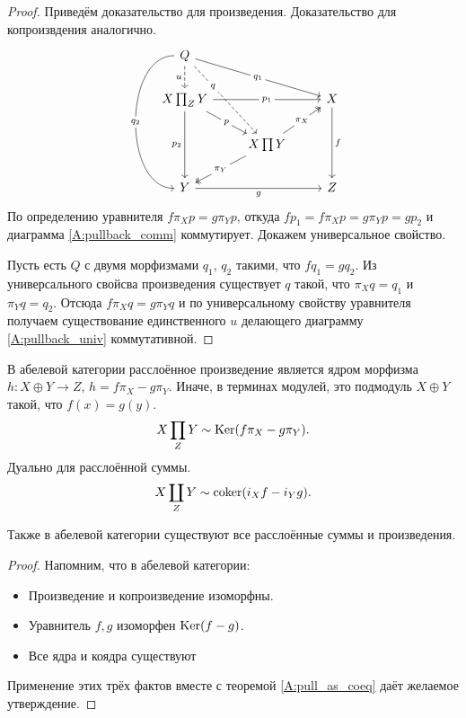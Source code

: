 \documentclass[../main.tex]{subfiles}
\begin{document}
\begin{proof}
Приведём доказательство для произведения. Доказательство для копроизвдения аналогично.
\begin{equation*}
\begin{tikzcd}
	Q \\
	{X\prod_Z Y} && X \\
	& {X\prod Y} \\
	Y && Z
	\arrow["g"', from=4-1, to=4-3]
	\arrow["f", from=2-3, to=4-3]
	\arrow["{\pi_X}"{description}, two heads, from=3-2, to=2-3]
	\arrow["{\pi_Y}"{description}, two heads, from=3-2, to=4-1]
	\arrow["p"{description}, from=2-1, to=3-2]
	\arrow["{p_1}"{description}, from=2-1, to=2-3]
	\arrow["{p_2}"', from=2-1, to=4-1]
	\arrow["{q_1}"{description}, from=1-1, to=2-3]
	\arrow["{q_2}"{description}, bend right=90, from=1-1, to=4-1]
	\arrow["q"{description, pos=0.3}, dashed, from=1-1, to=3-2]
	\arrow["u"', dashed, from=1-1, to=2-1]
\end{tikzcd}
\end{equation*}
По определению уравнителя $f\pi_Xp = g\pi_Yp$, откуда $fp_1 = f\pi_X p = g\pi_Yp = gp_2$ и диаграмма \eqref{A:pullback_comm} коммутирует. Докажем универсальное свойство.

Пусть есть $Q$ с двумя морфизмами $q_1$, $q_2$ такими, что $fq_1 = gq_2$. Из универсального свойсва произведения существует $q$ такой, что $\pi_X q = q_1$ и $\pi_Y q = q_2$. Отсюда $f\pi_X q = g\pi_Y q$ и по универсальному свойству уравнителя получаем существование единственного $u$ делающего диаграмму \eqref{A:pullback_univ} коммутативной.
\end{proof}
\newpage
\begin{to_con}\label{A:pull_in_ab}
В абелевой категории расслоённое произведение является ядром морфизма $h:X\oplus Y \to Z$, $h = f\pi_X - g\pi_Y$. Иначе, в терминах модулей, это подмодуль $X\oplus Y$ такой, что $f(x) = g(y)$.
\begin{equation*}
    X\prod_Z Y \sim \mathop{\mathrm{Ker}}\nolimits(f\pi_X - g\pi_Y).
\end{equation*}
Дуально для расслоённой суммы.
\begin{equation*}
X\coprod_Z Y \sim \operatorname{coker}(i_X f - i_Y g).
\end{equation*}

Также в абелевой категории существуют все расслоённые суммы и произведения.
\end{to_con}
\begin{proof}
    Напомним, что в абелевой категории:
    \begin{itemize}
        \item Произведение и копроизведение изоморфны.
        \item Уравнитель $f, g$ изоморфен $\mathop{\mathrm{Ker}}\nolimits (f-g)$.
        \item Все ядра и коядра существуют
    \end{itemize}
    Применение этих трёх фактов вместе с теоремой \ref{A:pull_as_coeq} даёт желаемое утверждение.
\end{proof}
\end{document}

